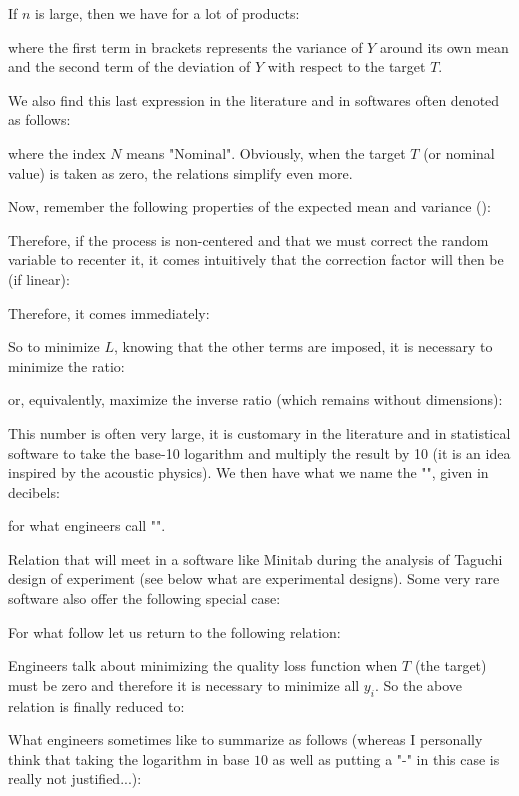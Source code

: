 	If $n$ is large, then we have for a lot of products:
	
	where the first term in brackets represents the variance of $Y$ around its own mean and the second term of the deviation of $Y$ with respect to the target $T$.
	
	We also find this last expression in the literature and in softwares often denoted as follows:
	
	where the index $N$ means "Nominal". Obviously, when the target $T$ (or nominal value) is taken as zero, the relations simplify even more.
	
	Now, remember the following properties of the expected mean and variance ():
	
	Therefore, if the process is non-centered and that we must correct the random variable to recenter it, it comes intuitively that the correction factor will then be (if linear):
	
	Therefore, it comes immediately:
	
	So to minimize $L$, knowing that the other terms are imposed, it is necessary to minimize the ratio:
	
	or, equivalently, maximize the inverse ratio (which remains without dimensions):
	
	This number is often very large, it is customary in the literature and in statistical software to take the base-10 logarithm and multiply the result by 10 (it is an idea inspired by the acoustic physics). We then have what we name the "", given in decibels:
	
	for what engineers call "".
	
	Relation that will meet in a software like Minitab during the analysis of Taguchi design of experiment (see below what are experimental designs). Some very rare software also offer the following special case:
	
	For what follow let us return to the following relation:
	
	Engineers talk about minimizing the quality loss function when $T$ (the target) must be zero and therefore it is necessary to minimize all $y_i$. So the above relation is finally reduced to:
	
	What engineers sometimes like to summarize as follows (whereas I personally think that taking the logarithm in base $10$ as well as putting a "-" in this case is really not justified...):
	

